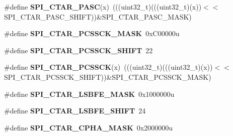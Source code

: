 \begin{DoxyCompactItemize}
\item 
\#define {\bfseries S\+P\+I\+\_\+\+C\+T\+A\+R\+\_\+\+P\+A\+SC}(x)~(((uint32\+\_\+t)(((uint32\+\_\+t)(x))$<$$<$S\+P\+I\+\_\+\+C\+T\+A\+R\+\_\+\+P\+A\+S\+C\+\_\+\+S\+H\+I\+FT))\&S\+P\+I\+\_\+\+C\+T\+A\+R\+\_\+\+P\+A\+S\+C\+\_\+\+M\+A\+SK)\hypertarget{group__SPI__Register__Masks_gae16156d09743ff57feb66a1e4c96d8c8}{}\label{group__SPI__Register__Masks_gae16156d09743ff57feb66a1e4c96d8c8}

\item 
\#define {\bfseries S\+P\+I\+\_\+\+C\+T\+A\+R\+\_\+\+P\+C\+S\+S\+C\+K\+\_\+\+M\+A\+SK}~0x\+C00000u\hypertarget{group__SPI__Register__Masks_ga27ec6f89727e91f1d272d06c6f1c44b3}{}\label{group__SPI__Register__Masks_ga27ec6f89727e91f1d272d06c6f1c44b3}

\item 
\#define {\bfseries S\+P\+I\+\_\+\+C\+T\+A\+R\+\_\+\+P\+C\+S\+S\+C\+K\+\_\+\+S\+H\+I\+FT}~22\hypertarget{group__SPI__Register__Masks_ga8bb5e598d3bbadd3efc273c57bc522ab}{}\label{group__SPI__Register__Masks_ga8bb5e598d3bbadd3efc273c57bc522ab}

\item 
\#define {\bfseries S\+P\+I\+\_\+\+C\+T\+A\+R\+\_\+\+P\+C\+S\+S\+CK}(x)~(((uint32\+\_\+t)(((uint32\+\_\+t)(x))$<$$<$S\+P\+I\+\_\+\+C\+T\+A\+R\+\_\+\+P\+C\+S\+S\+C\+K\+\_\+\+S\+H\+I\+FT))\&S\+P\+I\+\_\+\+C\+T\+A\+R\+\_\+\+P\+C\+S\+S\+C\+K\+\_\+\+M\+A\+SK)\hypertarget{group__SPI__Register__Masks_ga1d67f4830c56355cfbee79721e4d30d3}{}\label{group__SPI__Register__Masks_ga1d67f4830c56355cfbee79721e4d30d3}

\item 
\#define {\bfseries S\+P\+I\+\_\+\+C\+T\+A\+R\+\_\+\+L\+S\+B\+F\+E\+\_\+\+M\+A\+SK}~0x1000000u\hypertarget{group__SPI__Register__Masks_gadefae41f4962681a83ae61a653026dc2}{}\label{group__SPI__Register__Masks_gadefae41f4962681a83ae61a653026dc2}

\item 
\#define {\bfseries S\+P\+I\+\_\+\+C\+T\+A\+R\+\_\+\+L\+S\+B\+F\+E\+\_\+\+S\+H\+I\+FT}~24\hypertarget{group__SPI__Register__Masks_ga5f3c8977a22e59cab407497ba5e32dc9}{}\label{group__SPI__Register__Masks_ga5f3c8977a22e59cab407497ba5e32dc9}

\item 
\#define {\bfseries S\+P\+I\+\_\+\+C\+T\+A\+R\+\_\+\+C\+P\+H\+A\+\_\+\+M\+A\+SK}~0x2000000u\hypertarget{group__SPI__Register__Masks_ga562416b33f74ea5595e122d862093e51}{}\label{group__SPI__Register__Masks_ga562416b33f74ea5595e122d862093e51}


\end{DoxyCompactItemize}
